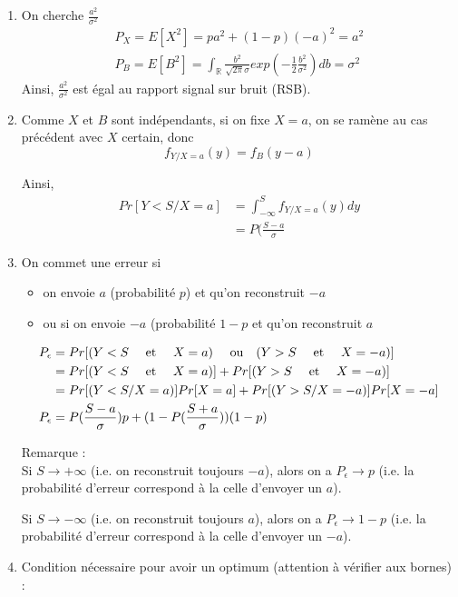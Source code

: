 \documentclass[main.tex]{subfiles}
\begin{document}
\begin{enumerate}
\item On cherche $\frac{a^2}{\sigma^2}$\\
\begin{align*}
P_X = E[X^2] = pa^2+(1-p)(-a)^2 = a^2\\
P_B = E[B^2] = \int_\mathbb{R} \frac{b^2}{\sqrt{2\pi}\sigma}exp(-\frac{1}{2}\frac{b^2}{\sigma ^2}) db = \sigma ^2 
\end{align*}
Ainsi, $\frac{a^2}{\sigma^2}$ est égal au rapport signal sur bruit (RSB).

\item Comme $X$ et $B$ sont indépendants, si on fixe $X=a$, on se ramène au cas précédent avec $X$ certain, donc
\[ f_{Y/X=a}(y) = f_B(y-a) \]

Ainsi,
\begin{align*}
Pr[Y<S/X=a] & = \int_{-\infty}^S f_{Y/X=a}(y)dy \\
& = P(\frac{S-a}{\sigma}
\end{align*}

\item On commet une erreur si
\begin{itemize}
\item on envoie $a$ (probabilité $p$) et qu'on reconstruit $-a$
\item ou si on envoie $-a$ (probabilité $1-p$ et qu'on reconstruit $a$ 
\end{itemize}

\begin{align*}
P_{\epsilon} & = Pr[(Y<S \quad\text{ et }\quad X=a) \quad\text{ ou}\quad (Y>S \quad\text{ et }\quad X = -a)] \\
& = Pr[(Y<S \quad\text{ et }\quad X=a)] + Pr[(Y>S \quad\text{ et }\quad X = -a)] \\
& = Pr[(Y<S / X=a)]Pr[X=a] + Pr[(Y>S / X = -a)]Pr[X=-a] \\
P_{\epsilon} & = P(\frac{S-a}{\sigma})p+(1-P(\frac{S+a}{\sigma}))(1-p)
\end{align*}

Remarque : \\
Si $S\rightarrow+\infty$ (i.e. on reconstruit toujours $-a$), alors on a $P_{\epsilon} \rightarrow p$ (i.e. la probabilité d'erreur correspond à la celle d'envoyer un $a$).

Si $S\rightarrow-\infty$ (i.e. on reconstruit toujours $a$), alors on a $P_{\epsilon} \rightarrow 1-p$ (i.e. la probabilité d'erreur correspond à la celle d'envoyer un $-a$).

\item Condition nécessaire pour avoir un optimum (attention à vérifier aux bornes) :


\end{enumerate}
\end{document}

